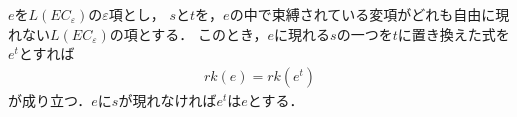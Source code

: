 	\begin{comment}
	実際に$L(EC_{\varepsilon})$の全ての$\varepsilon$項に対して階数が定まっている．
	(構造的帰納法について準備不足だが，直感的に次の説明は妥当である...)
	\begin{description}
		\item[step1] $e$が$L(EC)$の式で作られた$\varepsilon$項ならば$e$の階数は$1$である．
		
		\item[step3] 項$\tau_{1},\cdots,\tau_{n}$のそれぞれに対して，
			その全ての部分$\varepsilon$項に階数が定まっていれば，
			$f$を$n$項関数として，$f\tau_{1}\cdots\tau_{n}$の階数は
			$rk(\tau_{1}),\cdots,rk(\tau_{n})$の中の最大値である．
			というのも，$f\tau_{1}\cdots\tau_{n}$に現れる$\varepsilon$項は
			$\tau_{1},\cdots,\tau_{n}$のいずれかの部分項になっているためである．
			
		\item[step4] 項$\tau_{1},\cdots,\tau_{n}$のそれぞれに対して，
			その全ての部分$\varepsilon$項に階数が定まっていれば，
			$p$を$n$項述語として，$p\tau_{1}\cdots\tau_{n}$の階数は
			$rk(\tau_{1}),\cdots,rk(\tau_{n})$の中の最大値である．
		
		\item[step5] 式$\varphi$と$\psi$のそれぞれに対して，
			その全ての部分$\varepsilon$項に階数が定まっていれば，
			\begin{align}
				rk(\rightharpoondown \varphi) &\coloneqq rk(\varphi), \\
				rk(\vee \varphi \psi) &\coloneqq \max\{rk(\varphi),rk(\psi)\}, \\
				rk(\wedge \varphi \psi) &\coloneqq \max\{rk(\varphi),rk(\psi)\}, \\
				rk(\Longrightarrow \varphi \psi) 
				&\coloneqq \max\{rk(\varphi),rk(\psi)\}, \\
			\end{align}
			である．というのも，左辺の式に現れる$\varepsilon$項は
			$\varphi$か$\psi$の少なくとも一方に現れているからである．
		
		\item[step2] $e$に従属している全ての$\varepsilon$項に対して階数が定まっているならば，
			$e$の階数は定義通りに定めることが出来る．
	\end{description}
	\end{comment}
	
	\begin{screen}
		\begin{metathm}[階数定理]
			$e$を$L(EC_{\varepsilon})$の$\varepsilon$項とし，
			$s$と$t$を，$e$の中で束縛されている変項がどれも自由に現れない$L(EC_{\varepsilon})$の項とする．
			このとき，$e$に現れる$s$の一つを$t$に置き換えた式を$e^{t}$とすれば
			\begin{align}
				rk(e) = rk(e^{t})
			\end{align}
			が成り立つ．$e$に$s$が現れなければ$e^{t}$は$e$とする．
		\end{metathm}
	\end{screen}
	
